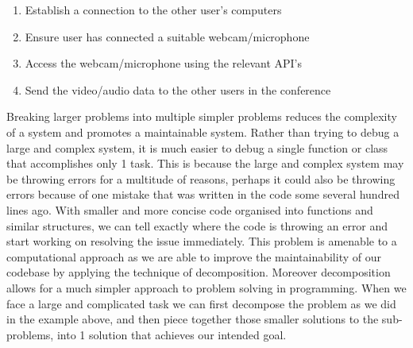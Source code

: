\begin{enumerate}
  \item Establish a connection to the other user's computers 
  \item Ensure user has connected a suitable webcam/microphone
  \item Access the webcam/microphone using the relevant API's
  \item{Send the video/audio data to the other users in the 
        conference}
\end{enumerate}

Breaking larger problems into multiple simpler problems 
reduces the complexity of a system and promotes a  
maintainable system. Rather than trying to debug a large and
complex system, it is much easier to debug a single function 
or class
that accomplishes only 1 task. This is because the large and 
complex system may be throwing errors for a multitude of 
reasons, perhaps it could also be throwing errors because of
one mistake that was written in the code some several hundred
lines ago. With smaller and more concise code organised into
functions and similar structures, we can tell exactly where the
code is throwing an error and start working on resolving the 
issue immediately. This problem is amenable to a computational 
approach as we are able to improve the maintainability of our
codebase by applying the technique of decomposition. Moreover
decomposition allows for a much simpler approach to problem 
solving in programming. When we face a large and complicated 
task we can first decompose the problem as we did in the 
example above, and then piece together those smaller solutions
to the sub-problems, into 1 solution that achieves our intended
goal. \vspace{0.2cm}

